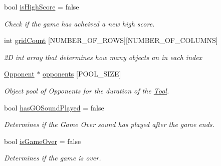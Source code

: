 \begin{DoxyCompactItemize}
\mbox{\label{class_tool_a0351df92aa63546f119fc20bcd682ebd}} 
bool \mbox{\hyperlink{class_tool_a0351df92aa63546f119fc20bcd682ebd}{is\+High\+Score}} = false
\begin{DoxyCompactList}\small\item\em Check if the game has acheived a new high score. \end{DoxyCompactList}\item 
\mbox{\label{class_tool_a7164f389cbeb55aa232dfd6a40b81ba7}} 
int \mbox{\hyperlink{class_tool_a7164f389cbeb55aa232dfd6a40b81ba7}{grid\+Count}} \mbox{[}N\+U\+M\+B\+E\+R\+\_\+\+O\+F\+\_\+\+R\+O\+WS\mbox{]}\mbox{[}N\+U\+M\+B\+E\+R\+\_\+\+O\+F\+\_\+\+C\+O\+L\+U\+M\+NS\mbox{]}
\begin{DoxyCompactList}\small\item\em 2D int array that determines how many objects an in each index \end{DoxyCompactList}\item 
\mbox{\label{class_tool_a7d048eeb0bcf93ba7f842a0ad29c112e}} 
\mbox{\hyperlink{class_opponent}{Opponent}} $\ast$ \mbox{\hyperlink{class_tool_a7d048eeb0bcf93ba7f842a0ad29c112e}{opponents}} \mbox{[}P\+O\+O\+L\+\_\+\+S\+I\+ZE\mbox{]}
\begin{DoxyCompactList}\small\item\em Object pool of Opponents for the duration of the \mbox{\hyperlink{class_tool}{Tool}}. \end{DoxyCompactList}\item 
\mbox{\label{class_tool_acc20893dd60397557bc0936ea22b3363}} 
bool \mbox{\hyperlink{class_tool_acc20893dd60397557bc0936ea22b3363}{has\+G\+O\+Sound\+Played}} = false
\begin{DoxyCompactList}\small\item\em Determines if the Game Over sound has played after the game ends. \end{DoxyCompactList}\item 
\mbox{\label{class_tool_af3c237726a88ae8e33e60d3d850ccfb6}} 
bool \mbox{\hyperlink{class_tool_af3c237726a88ae8e33e60d3d850ccfb6}{is\+Game\+Over}} = false
\begin{DoxyCompactList}\small\item\em Determines if the game is over. \end{DoxyCompactList}\item 

\end{DoxyCompactItemize}

